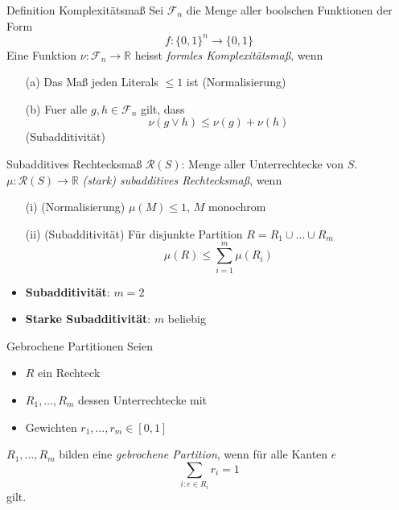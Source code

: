 \begin{frame}{}
    \begin{block}{Definition Komplexit\"atsma\ss{}}
        Sei $\mathcal{F}_n$ die Menge aller boolschen Funktionen der Form 
        \[
        f : \{0,1\}^n \rightarrow \{0,1\}
        \]
        Eine Funktion $\nu : \mathcal{F}_n \rightarrow \mathbb{R}$ heisst \textit{formles Komplexit\"atsma\ss{}}, wenn
        \pause
        \begin{itemize}
            \item[(a)]Das Ma\ss{} jeden Literals $\leq 1$ ist (Normalisierung)
            \pause
            \item[(b)]Fuer alle $g,h \in \mathcal{F}_n$ gilt, dass
            \[
                \nu(g \lor h) \leq \nu(g) + \nu(h)
            \]
            (Subadditivit\"at)
        \end{itemize}
    \end{block}
\end{frame}

\begin{frame}{}
    \begin{block}{Subadditives Rechtecksma\ss{}}
        $\mathcal{R}(S)$: Menge aller Unterrechtecke von $S$.\\\vspace*{0.5cm}
        \pause
        $\mu : \mathcal{R}(S) \rightarrow \mathbb{R}$ \textit{(stark) subadditives Rechtecksma\ss{}}, wenn
        \begin{itemize}
            \item[(i)] (Normalisierung) $\mu(M) \leq 1$, $M$ monochrom
            \item[(ii)] (Subadditivit\"at) F\"ur disjunkte Partition $R = R_1 \cup \dots \cup R_m$
            \[
                \mu(R) \leq \sum_{i=1}^m \mu(R_i)
            \]
            \pause
        \end{itemize}
        \begin{itemize}
            \item \textbf{Subadditivit\"at}: $m = 2$\\
            \item \textbf{Starke Subadditivit\"at}: $m$ beliebig
        \end{itemize}
    \end{block}
\end{frame}

\begin{frame}{}
    \begin{block}{Gebrochene Partitionen}
        Seien 
        \begin{itemize}
            \item $R$ ein Rechteck
            \item $R_1,\dots,R_m$ dessen Unterrechtecke mit
            \item Gewichten $r_1,\dots,r_m \in [0,1]$
        \end{itemize}
        \pause
        $R_1,\dots,R_m$ bilden eine \textit{gebrochene Partition}, wenn f\"ur alle Kanten $e$
        \[
            \sum_{i : e \in R_i} r_i = 1
        \]
        gilt.
    \end{block}
\end{frame}

